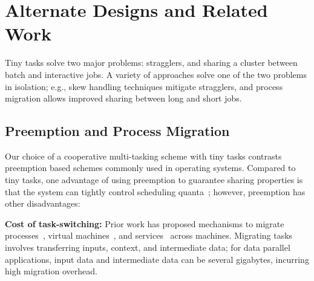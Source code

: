 \section{Alternate Designs and Related Work}
\label{sec:alternate}

Tiny tasks solve two major problems: stragglers, and sharing
a cluster between batch and interactive jobs. A variety of
approaches solve one of the two problems in isolation; e.g., skew handling
techniques mitigate stragglers, and process migration allows improved
sharing between long and short jobs.

\subsection{Preemption and Process Migration}
\label{sec:preemption}

Our choice of a cooperative multi-tasking scheme with tiny tasks
contrasts preemption based schemes commonly used
in operating systems.
Compared to tiny tasks, one advantage of using preemption to guarantee sharing
properties is that the system
can tightly control scheduling quanta~\cite{sherman1972trace,tanenbaum1990experiences};
however, preemption has other disadvantages:

\vspace{4pt}\noindent\textbf{Cost of task-switching:}
Prior work has proposed mechanisms to migrate
processes~\cite{douglis1991transparent,milojivcic2000process}, virtual
machines~\cite{clark2005live}, and services~\cite{rozier1991overview} across
machines.
Migrating tasks involves transferring inputs, context, and intermediate
data; for data parallel applications, input data and intermediate
data can be several gigabytes, incurring high migration overhead.

